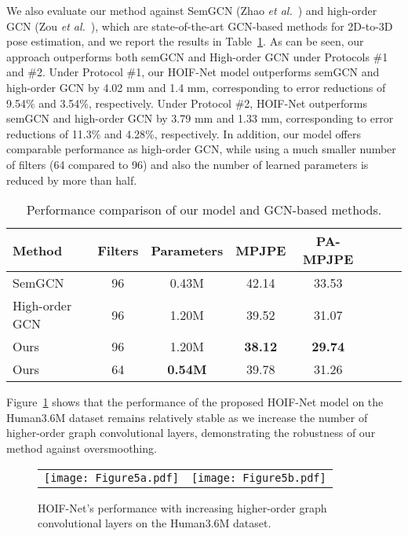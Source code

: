 \documentclass{bmvc2k}
\begin{document}
We also evaluate our method against SemGCN (Zhao \textit{et al.}~\cite{zhao2019semantic}) and high-order GCN (Zou \textit{et al.}~\cite{zou2020high}), which are state-of-the-art GCN-based methods for 2D-to-3D pose estimation, and we report the results in Table~\ref{Tab:baseline}. As can be seen, our approach outperforms both semGCN and High-order GCN under Protocols \#1 and \#2. Under Protocol \#1, our HOIF-Net model outperforms semGCN and high-order GCN by 4.02 mm and 1.4 mm, corresponding to error reductions of 9.54\% and 3.54\%, respectively. Under Protocol \#2, HOIF-Net outperforms semGCN and high-order GCN by 3.79 mm and 1.33 mm, corresponding to error reductions of 11.3\% and 4.28\%, respectively. In addition, our model offers comparable performance as high-order GCN, while using a much smaller number of filters (64 compared to 96) and also the number of learned parameters is reduced by more than half.

\begin{table}[!htb]
\caption{Performance comparison of our model and GCN-based methods.}
\small
\setlength{\tabcolsep}{2.5pt}
\medskip
\centering
\begin{tabular}{l*{7}{c}}
\toprule
Method & Filters & Parameters & MPJPE & PA-MPJPE\\
\midrule
SemGCN~\cite{zhao2019semantic} & 96 & 0.43M & 42.14 & 33.53 \\
High-order GCN~\cite{zou2020high}  & 96 & 1.20M & 39.52 &31.07 \\
\midrule
Ours & 96 & 1.20M &\textbf{38.12} &\textbf{29.74} \\
Ours & 64 & \textbf{0.54M} & 39.78 & 31.26\\
\bottomrule

\end{tabular}
\label{Tab:baseline}
\end{table}

Figure~\ref{Fig:oversmoothing} shows that the performance of the proposed HOIF-Net model on the Human3.6M dataset remains relatively stable as we increase the number of higher-order graph convolutional layers, demonstrating the robustness of our method against oversmoothing.
\begin{figure}[!htb]
\centering
\setlength{\tabcolsep}{5pt}
\begin{tabular}{cc}
\texttt{[image: Figure5a.pdf]} & \texttt{[image: Figure5b.pdf]}
\end{tabular}
\caption{HOIF-Net's performance with increasing higher-order graph convolutional layers on the Human3.6M dataset.}
\label{Fig:oversmoothing}
\end{figure}
\end{document}

